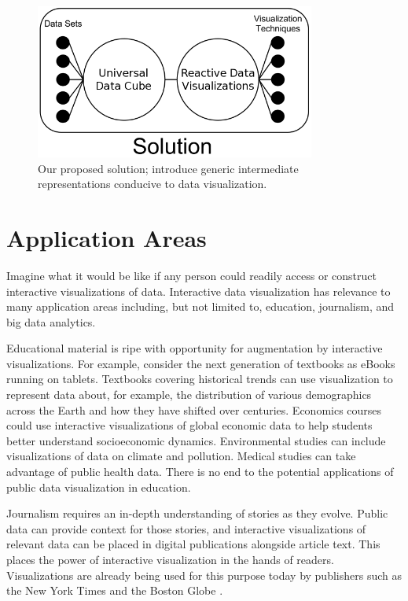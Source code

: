 \begin{figure}
  \centering
  \includegraphics[height=2in]{figs/Solution.png}
  \caption[Introducing Intermediate Representations.]
   {Our proposed solution; introduce generic intermediate representations conducive to data visualization.}
  \label{fig:solution}
\end{figure}

\section{Application Areas}
Imagine what it would be like if any person could readily access or construct interactive visualizations of data. Interactive data visualization has relevance to many application areas including, but not limited to, education, journalism, and big data analytics.

Educational material is ripe with opportunity for augmentation by interactive visualizations. For example, consider the next generation of textbooks as eBooks running on tablets. Textbooks covering historical trends can use visualization to represent data about, for example, the distribution of various demographics across the Earth and how they have shifted over centuries. Economics courses could use interactive visualizations of global economic data to help students better understand socioeconomic dynamics. Environmental studies can include visualizations of data on climate and pollution. Medical studies can take advantage of public health data. There is no end to the potential applications of public data visualization in education.

Journalism requires an in-depth understanding of stories as they evolve. Public data can provide context for those stories, and interactive visualizations of relevant data can be placed in digital publications alongside article text. This places the power of interactive visualization in the hands of readers. Visualizations are already being used for this purpose today by publishers such as the New York Times and the Boston Globe \cite{royal2010journalist}.


